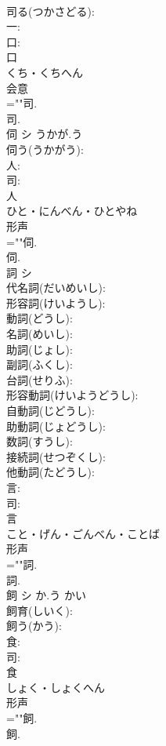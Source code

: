 \documentclass[8pt]{extreport}
\begin{document}
\begin{CJK}{UTF8}{min}
\\	司る(つかさどる): 
\\	一: 
\\	口: 
\\	口	
\\	くち・くちへん	
\\	会意 
\\	=""司.
\\	司.
\\	伺	シ	うかが.う		
\\	伺う(うかがう): 
\\	人: 
\\	司: 
\\	人	
\\	ひと・にんべん・ひとやね	
\\	形声 
\\	=""伺.
\\	伺.
\\	詞	シ			
\\	代名詞(だいめいし): 
\\	形容詞(けいようし): 
\\	動詞(どうし): 
\\	名詞(めいし): 
\\	助詞(じょし): 
\\	副詞(ふくし): 
\\	台詞(せりふ): 
\\	形容動詞(けいようどうし): 
\\	自動詞(じどうし): 
\\	助動詞(じょどうし): 
\\	数詞(すうし): 
\\	接続詞(せつぞくし): 
\\	他動詞(たどうし): 
\\	言: 
\\	司: 
\\	言	
\\	こと・げん・ごんべん・ことば	
\\	形声 
\\	=""詞.
\\	詞.
\\	飼	シ	か.う	かい	
\\	飼育(しいく): 
\\	飼う(かう): 
\\	食: 
\\	司: 
\\	食	
\\	しょく・しょくへん	
\\	形声 
\\	=""飼.
\\	飼.

\end{CJK}
\end{document}
